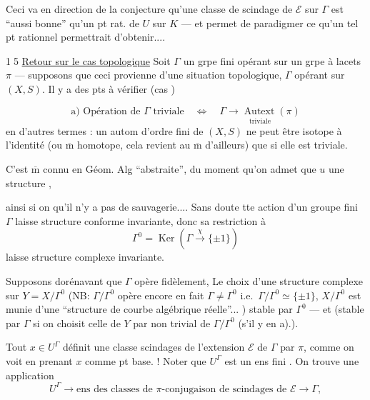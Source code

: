 Ceci va en direction de la conjecture qu'une classe de scindage de $\mathcal E$ sur $\Gamma$ est ``aussi bonne'' qu'un pt rat. de $U$ sur $K$ --- et permet de paradigmer ce qu'un tel pt rationnel permettrait d'obtenir....

\textcircled{15} \uline{Retour sur le cas topologique} Soit $\Gamma$ un grpe fini opérant sur un grpe à lacets $\pi$ --- supposons que ceci provienne d'une situation topologique, $\Gamma$ opérant sur $(X,S)$. Il y a des pts à vérifier (cas \uline{})

\[
\text{a) Opération de }\Gamma\text{ triviale}
\quad\Longleftrightarrow\quad
\underset{\text{triviale}}{\Gamma\longrightarrow\operatorname{Autext}(\pi)}
\]
en d'autres termes : un autom d'ordre fini de $(X,S)$ ne peut être isotope à l'identité (ou $\overline{\mathrm m}$  homotope, cela revient au $\overline{\mathrm m}$ d'ailleurs) que si elle est triviale.

C'est $\overline{\mathrm m}$ connu en Géom. Alg ``abstraite'', du moment qu'on admet que $u$  une structure  ,  

ainsi si on   qu'il n'y a pas de sauvagerie.... Sans doute tte action d'un groupe fini $\Gamma$ laisse structure conforme invariante,  donc sa restriction à
\[
\Gamma^0=\operatorname{Ker}(\Gamma\xrightarrow{\chi}\{\pm1\})
\]
laisse structure complexe invariante.

Supposons dorénavant que $\Gamma$ opère fidèlement,   Le choix d'une structure complexe sur $Y=X/\Gamma^0$  (NB:  $\Gamma/\Gamma^0$ opère encore  en fait   $\Gamma\ne\Gamma^0$ i.e.\ $\Gamma/\Gamma^0\simeq\{\pm1\}$, $X/\Gamma^0$ est munie d'une ``structure de  courbe algébrique  réelle''... ) stable par $\Gamma^0$ --- et (stable par $\Gamma$ si on choisit celle de $Y$   par  non trivial de $\Gamma/\Gamma^0$ (s'il y en a).).

 Tout $x\in U^\Gamma$ définit une classe   scindages de l'extension $\mathcal E$ de $\Gamma$ par $\pi$, comme on voit en prenant $x$ comme pt base. ! Noter que $U^\Gamma$ est un ens fini \inserted{si $\Gamma^0\ne1$, [i.e.\ $\Gamma$ pas réduit à une \deleted{\illegible{1}} \unsure{anti-involution} \illegible{1})}.
On trouve  une application
\[
U^\Gamma\longrightarrow\text{ens des classes de }\pi\text{-conjugaison de scindages de }\mathcal E\longrightarrow\Gamma,
\]

